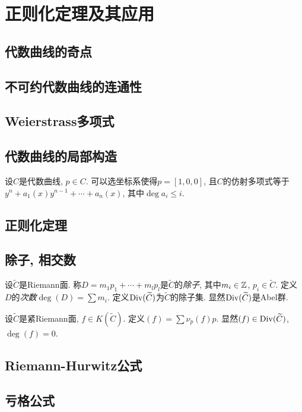 \chapter{正则化定理及其应用}\label{c2}
\section{代数曲线的奇点}\label{s2-1}

\section{不可约代数曲线的连通性}\label{s2-2}

\section{Weierstrass多项式}

\section{代数曲线的局部构造}
\begin{lemma}
    设$C$是代数曲线, $p\in C$. 可以选坐标系使得$p=[1,0,0]$, 且$C$的仿射多项式等于$y^n+a_1(x)y^{n-1}+\cdots+a_n(x)$, 其中$\deg a_i\leq i$. 
\end{lemma}


\section{正则化定理}

\section{除子, 相交数}
\begin{definition}
    设$\widetilde{C}$是Riemann面. 称$D=m_1p_1+\cdots+m_lp_l$是$\widetilde{C}$的\textit{除子}, 其中$m_i\in\mathbb{Z}$, $p_i\in\widetilde{C}$. 定义$D$的\textit{次数}$\deg(D)=\sum m_i$. 定义$\operatorname*{Div}(\widetilde{C})$为$\widetilde{C}$的除子集. 显然$\operatorname*{Div}(\widetilde{C})$是Abel群. 
\end{definition}
\begin{definition}
    设$\widetilde{C}$是紧Riemann面, $f\in K(\widetilde{C})$. 定义$(f)=\sum\nu_p(f)p$. 显然$(f)\in\operatorname*{Div}(\widetilde{C})$, $\deg(f)=0$. 
\end{definition}
\begin{definition}
    
\end{definition}

\section{Riemann-Hurwitz公式}

\section{亏格公式}
